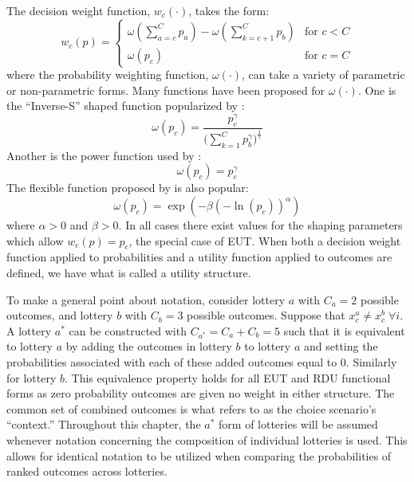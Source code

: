 \documentclass[../main.tex]{subfiles}
\begin{document}
The decision weight function, $w_c(\cdot)$, takes the form:
\begin{equation}
	\label{eq2:dweight}
	w_c(p) =
	\begin{cases}
		\omega\left(\displaystyle\sum_{a=c}^C p_a\right) - \omega\left(\displaystyle\sum_{k=c+1}^C p_b\right) & \text{for } c<C \\
		\omega(p_c) & \text{for } c = C
	\end{cases}
\end{equation}
\noindent where the probability weighting function, $\omega(\cdot)$, can take a variety of parametric or non-parametric forms.
Many functions have been proposed for $\omega(\cdot)$.
One is the \enquote{Inverse-S} shaped function popularized by \textcite{Tversky1992}:
\begin{equation}
	\label{eq2:pw:kahneman}
	\omega(p_c) = \frac{p_c^\gamma}{\biggl(\sum\limits_{k=1}^{C} p_b^\gamma\biggr)^{ \frac{1}{\gamma} } }
\end{equation}
\noindent Another is the power function used by \textcite{Quiggin1982}:
\begin{equation}
	\label{eq2:pw:quiggin}
	\omega(p_c)=p_c^\gamma
\end{equation}
\noindent The flexible function proposed by \textcite{Prelec1998} is also popular:
\begin{equation}
	\label{eq2:pw:prelec}
	\omega(p_c)=\exp(-\beta(-\ln(p_c))^\alpha)
\end{equation}
\noindent where $\alpha > 0$ and $\beta > 0$.
In all cases there exist values for the shaping parameters which allow $w_c(p) = p_c$, the special case of EUT.
When both a decision weight function applied to probabilities and a utility function applied to outcomes are defined, we have what is called a utility structure.

To make a general point about notation, consider lottery $a$ with $C_a = 2$ possible outcomes, and lottery $b$ with $C_b = 3$ possible outcomes.
Suppose that $x_c^a \neq x_c^b \; \forall i$.
A lottery $a^*$ can be constructed with $C_{a^*}= C_a + C_b = 5$ such that it is equivalent to lottery $a$ by adding the outcomes in lottery $b$ to lottery $a$ and setting the probabilities associated with each of these added outcomes equal to $0$.
Similarly for lottery $b$.
This equivalence property holds for all EUT and RDU functional forms as zero probability outcomes are given no weight in either structure.
The common set of combined outcomes is what \textcite{Wilcox2008} refers to as the choice scenario's \enquote{context.}
Throughout this chapter, the $a^*$ form of lotteries will be assumed whenever notation concerning the composition of individual lotteries is used.
This allows for identical notation to be utilized when comparing the probabilities of ranked outcomes across lotteries.
\end{document}
